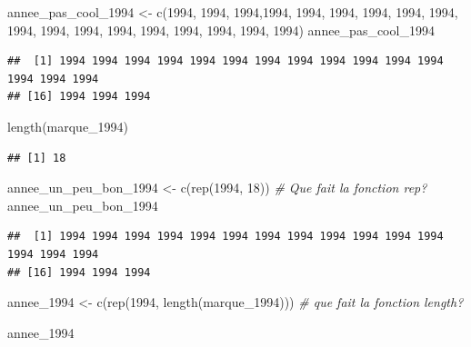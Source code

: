 \documentclass[
]{article}
\newenvironment{Shaded}{\begin{snugshade}}{\end{snugshade}}
\newcommand{\CommentTok}[1]{\textcolor[rgb]{0.56,0.35,0.01}{\textit{#1}}}
\newcommand{\DecValTok}[1]{\textcolor[rgb]{0.00,0.00,0.81}{#1}}
\newcommand{\FunctionTok}[1]{\textcolor[rgb]{0.00,0.00,0.00}{#1}}
\newcommand{\NormalTok}[1]{#1}
\newcommand{\OtherTok}[1]{\textcolor[rgb]{0.56,0.35,0.01}{#1}}
\begin{document}
\begin{Shaded}
\begin{Highlighting}[]
\NormalTok{annee\_pas\_cool\_1994 }\OtherTok{\textless{}{-}} \FunctionTok{c}\NormalTok{(}\DecValTok{1994}\NormalTok{, }\DecValTok{1994}\NormalTok{, }\DecValTok{1994}\NormalTok{,}\DecValTok{1994}\NormalTok{, }\DecValTok{1994}\NormalTok{, }\DecValTok{1994}\NormalTok{, }\DecValTok{1994}\NormalTok{, }\DecValTok{1994}\NormalTok{, }\DecValTok{1994}\NormalTok{, }\DecValTok{1994}\NormalTok{, }\DecValTok{1994}\NormalTok{, }\DecValTok{1994}\NormalTok{, }\DecValTok{1994}\NormalTok{, }\DecValTok{1994}\NormalTok{, }\DecValTok{1994}\NormalTok{, }\DecValTok{1994}\NormalTok{, }\DecValTok{1994}\NormalTok{, }\DecValTok{1994}\NormalTok{)}
\NormalTok{annee\_pas\_cool\_1994}
\end{Highlighting}
\end{Shaded}

\begin{verbatim}
##  [1] 1994 1994 1994 1994 1994 1994 1994 1994 1994 1994 1994 1994 1994 1994 1994
## [16] 1994 1994 1994
\end{verbatim}

\begin{Shaded}
\begin{Highlighting}[]
\FunctionTok{length}\NormalTok{(marque\_1994)}
\end{Highlighting}
\end{Shaded}

\begin{verbatim}
## [1] 18
\end{verbatim}

\begin{Shaded}
\begin{Highlighting}[]
\NormalTok{annee\_un\_peu\_bon\_1994 }\OtherTok{\textless{}{-}} \FunctionTok{c}\NormalTok{(}\FunctionTok{rep}\NormalTok{(}\DecValTok{1994}\NormalTok{, }\DecValTok{18}\NormalTok{))  }\CommentTok{\# Que fait la fonction rep?}
\NormalTok{annee\_un\_peu\_bon\_1994}
\end{Highlighting}
\end{Shaded}

\begin{verbatim}
##  [1] 1994 1994 1994 1994 1994 1994 1994 1994 1994 1994 1994 1994 1994 1994 1994
## [16] 1994 1994 1994
\end{verbatim}

\begin{Shaded}
\begin{Highlighting}[]
\NormalTok{annee\_1994 }\OtherTok{\textless{}{-}} \FunctionTok{c}\NormalTok{(}\FunctionTok{rep}\NormalTok{(}\DecValTok{1994}\NormalTok{, }\FunctionTok{length}\NormalTok{(marque\_1994))) }\CommentTok{\# que fait la fonction length?}

\NormalTok{annee\_1994}
\end{Highlighting}
\end{Shaded}
\end{document}
